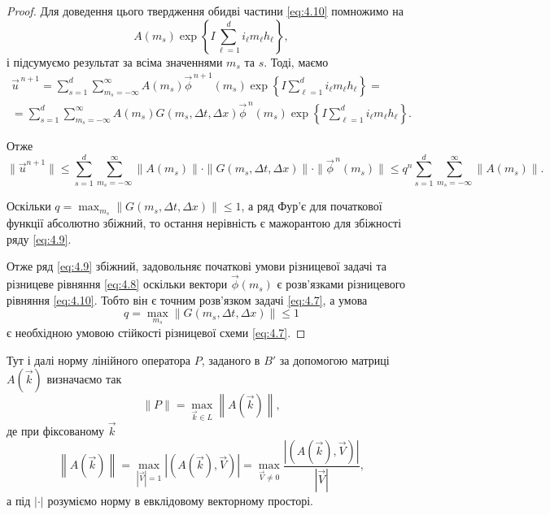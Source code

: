 \begin{proof}
	Для доведення цього твердження обидві частини \eqref{eq:4.10} помножимо на
	\begin{equation*}
	    A(m_s) \exp\left\{ I \sum_{\ell = 1}^d i_\ell m_\ell h_\ell \right\},
	\end{equation*}
	і підсумуємо результат за всіма значеннями $m_s$ та $s$. Тоді, маємо
	\begin{multline*}
	    \vec u^{\,n + 1} = \sum_{s = 1}^d \sum_{m_s = -\infty}^\infty A(m_s) \vec \phi^{\,n + 1}(m_s) \exp \left\{ I \sum_{\ell = 1}^d i_\ell m_\ell h_\ell \right\} = \\ = \sum_{s = 1}^d \sum_{m_s = -\infty}^\infty A(m_s) G(m_s, \Delta t, \Delta x) \vec \phi^{\,n}(m_s) \exp \left\{ I \sum_{\ell = 1}^d i_\ell m_\ell h_\ell \right\}.
	\end{multline*}

    Отже
    \begin{equation*}
        \|\vec u^{n + 1}\| \le \sum_{s = 1}^d \sum_{m_s = -\infty}^\infty \|A(m_s)\| \cdot \|G(m_s, \Delta t, \Delta x)\| \cdot \|\vec \phi^{\,n}(m_s)\| \le q^n \sum_{s = 1}^d \sum_{m_s = -\infty}^\infty \|A(m_s)\|.
    \end{equation*}

	Оскільки $q = \max_{m_s} \|G(m_s, \Delta t, \Delta x)\| \le 1$, а ряд Фур'є для початкової функції абсолютно збіжний, то остання нерівність є мажорантою для збіжності ряду \eqref{eq:4.9}.  \medskip

	Отже ряд \eqref{eq:4.9} збіжний, задовольняє початкові умови різницевої задачі та різницеве рівняння \eqref{eq:4.8} оскільки вектори $\vec \phi(m_s)$ є розв'язками різницевого рівняння \eqref{eq:4.10}. Тобто він є точним розв'язком задачі \eqref{eq:4.7}, а умова 
	\begin{equation*}
	    q = \max_{m_s} \|G(m_s, \Delta t, \Delta x)\| \le 1
	\end{equation*}
    є необхідною умовою стійкості різницевої схеми \eqref{eq:4.7}.
\end{proof}

Тут і далі норму лінійного оператора $P$, заданого в $B'$ за допомогою матриці $A \left( \vec k \right)$ визначаємо так 
\begin{equation*}
    \|P\| = \max_{\vec k \in L} \left\| A\left(\vec k\right)\right\|,
\end{equation*}
де при фіксованому $\vec k$
\begin{equation*}
    \left\|A\left(\vec k\right)\right\| = \max_{|\vec V| = 1} \left| \left( A\left( \vec k \right), \vec V \right) \right| = \max_{\vec V \ne 0} \frac{\left| \left( A\left( \vec k\right), \vec V\right)\right|}{\left| \vec V \right|},
\end{equation*}
а під $|\cdot|$ розуміємо норму в евклідовому векторному просторі.

